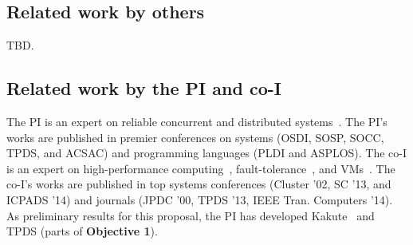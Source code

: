 \subsection{Related work by others} 
\label{sec:others-work}\vspace{-.075in}

TBD.

\vspace{-.15in}\subsection{Related work by the PI and co-I} 
\label{sec:my-work}\vspace{-.075in}
% 

The PI is an expert on reliable concurrent and distributed 
systems~\cite{smt:cacm, cui:tern:osdi10, peregrine:sosp11,
parrot:sosp13, crane:sosp15, tripod:apsys16}. The 
PI's works are published in premier conferences on systems (OSDI, SOSP, SOCC, 
TPDS, and ACSAC) and programming languages (PLDI and ASPLOS). The co-I is an 
expert on high-performance 
computing~\cite{powerrock,hwang,jessica,cheung,khokhar}, fault-tolerance~\cite{ 
sheng,shengdi1}, and VMs~\cite{rhymes,shengdi,jessica2}. The 
co-I's works are published in top systems conferences (Cluster '02, SC '13, 
and ICPADS '14) and journals (JPDC '00, TPDS '13, IEEE Tran. Computers '14). As 
preliminary results for this \xxx proposal, the PI has 
developed Kakute~\cite{kakute:acsac17} and TPDS (parts of \textbf{Objective 
1}). 


